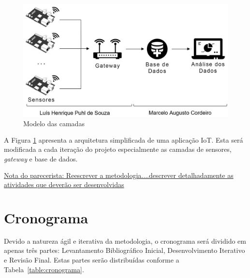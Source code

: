 \documentclass[
	12pt,				%
	openright,			%
	oneside,			%
	a4paper,			%
	chapter=TITLE,		%
	english,			%
	french,				%
	spanish,			%
	brazil				%
	]{abntex2}
\begin{document}
{\begin{figure}[htb]
	\caption{\label{fig:projeto}Modelo das camadas }
	\begin{center}
		\includegraphics[width=1\textwidth]{img/projeto.JPG}
	\end{center}
\end{figure}

A Figura \ref{fig:projeto} apresenta a arquitetura simplificada de uma aplicação
IoT. Esta será modificada a cada iteração do projeto especialmente as camadas de
sensores, \textit{gateway} e base de dados.

\underline{Nota do parecerista: Reescrever a metodologia....descrever
detalhadamente as atividades que deverão ser desenvolvidas}





\chapter{Cronograma}


Devido a natureza ágil e iterativa da metodologia, o cronograma será dividido em
apenas três partes: Levantamento Bibliográfico Inicial, Desenvolvimento
Iterativo e Revisão Final. Estas partes serão distribuídas conforme a
Tabela~\ref{table:cronograma}.

\begin{table}[htb]
\end{table}

}
\end{document}
